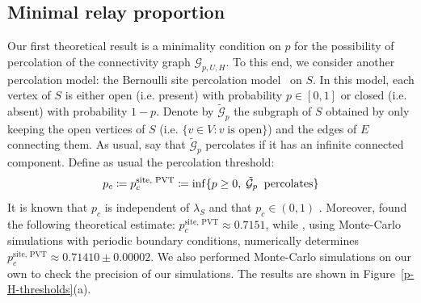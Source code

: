 \documentclass[conference]{IEEEtran}
\begin{document}
\subsection{Minimal relay proportion}
\label{relay-influence}

\indent Our first theoretical result is a minimality condition on  $p$ for the possibility of percolation of the connectivity graph $\mathcal{G}_{p,U,H}$. %
To this end, we consider another percolation model: the Bernoulli site percolation model~%
on $S$. In this model, each vertex of $S$ is either open (i.e. present) with probability $p \in \left[0,1\right]$ or closed (i.e. absent) with probability $1 - p$. 
Denote by $\tilde{\mathcal{G}}_{{p}}$ the subgraph of $S$ obtained by only keeping the open vertices of $S$ (i.e. $\lbrace v \in V: v \; \text{is open} \rbrace$) and the edges of $E$ connecting them. As usual, say that $\tilde{\mathcal{G}}_{{p}}$ percolates %
if it has an infinite connected component. Define as usual the percolation threshold:
\begin{equation}
\label{critical_site}
p_c \coloneqq p_{c}^{\text{site, PVT}} \coloneqq \inf \lbrace {p} \geq 0, \; \tilde{\mathcal{G}}_{p} \text{\: percolates} \rbrace
\end{equation}
It is known that %
$p_c$ is independent of $\lambda_{S}$ and that $p_c \in (0,1)$
\cite{ziesche2016bernoulli}.
Moreover, \cite{neher2008topological} found the following theoretical estimate: $p_{c}^{\text{site, PVT}} \approx 0.7151 $, while \cite{becker_percolation_2009}, using Monte-Carlo simulations with periodic boundary conditions, numerically determines $p_{c}^{\text{site, PVT}} \approx 0.71410 \pm 0.00002$. We also performed Monte-Carlo simulations on our own to check the precision of our simulations. The results are shown in Figure~\ref{p-H-thresholds}(a).
\end{document}
